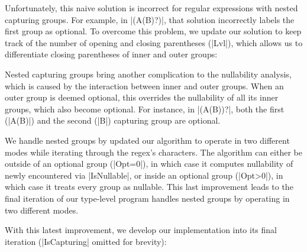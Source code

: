 \regexNaiveIsNullable
%

\noindent
Unfortunately, this naive solution is incorrect for regular expressions with nested capturing groups.
For example, in |(A(B)?)|, that solution incorrectly labels the first group as optional.
To overcome this problem, we update our solution to keep track of the number of opening and closing parentheses (|Lvl|), which allows us to differentiate closing parentheses of inner and outer groups:

\regexIsNullable

Nested capturing groups bring another complication to the nullability analysis, which is caused by the interaction between inner and outer groups.
When an outer group is deemed optional, this overrides the nullability of all its inner groups, which also become optional.
For instance, in |(A(B))?|, both the first (|A(B)|) and the second (|B|) capturing group are optional.

We handle nested groups by updated our algorithm to operate in two different modes while iterating through the regex's characters.
The algorithm can either be outside of an optional group (|Opt=0|), in which case it computes nullability of newly encountered via |IsNullable|, or inside an optional group (|Opt>0|), in which case it treats every group as nullable.
This last improvement leads to the final iteration of our type-level program handles nested groups by operating in two different modes.

With this latest improvement, we develop our implementation into its final iteration (|IsCapturing| omitted for brevity):

\regexLastIteration

